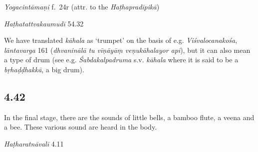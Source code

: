 \begin{ekdosis}
\begin{testimonia}[hp04_041]
\emph{Yogacintāmaṇi} f.~24r (attr. to the \emph{Haṭhapradīpikā})
\begin{versinnote}
\end{versinnote}    

\emph{Haṭhatattvakaumudī} 54.32
\begin{versinnote}
\end{versinnote}
\end{testimonia}

\begin{philcomm}[hp04_041]
We have translated \emph{kāhala} as `trumpet' on the basis of e.g. \emph{Viśvalocanakośa}, \emph{lāntavarga} 161 (\emph{dhvaninālā tu vīṇāyāṃ veṇukāhalayor api}), but it can also mean a type of drum (see e.g. \emph{Śabdakalpadruma} s.v. \emph{kāhala} where it is said to be a \emph{bṛhaḍḍhakkā}, a big drum).%
\end{philcomm}

\subsection*{4.42}
\begin{translation}[hp04_042]
In the final stage, there are the sounds of little bells, a bamboo flute, a veena and a bee. These various sound are heard in the body.
\end{translation}


\begin{testimonia}[hp04_042]
\emph{Haṭharatnāvalī} 4.11 
\begin{versinnote}
\end{versinnote}


\end{testimonia}
\end{ekdosis}
